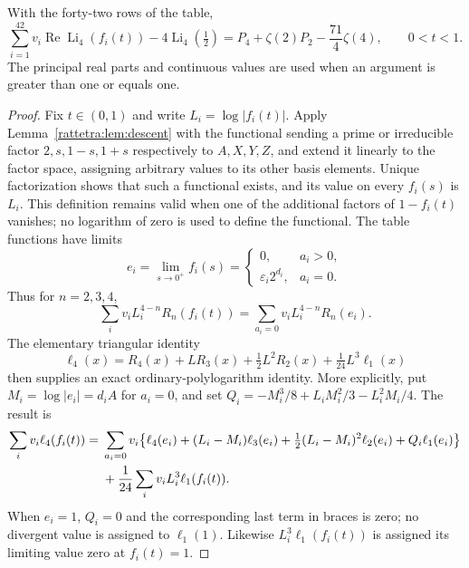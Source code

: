 \begin{theorem}
\label{rattetra:thm:functional}
With the forty-two rows of the table,
\begin{equation}
 \sum_{i=1}^{42}v_i\operatorname{Re}\operatorname{Li}_4(f_i(t))
 -4\operatorname{Li}_4(\tfrac12)
 =P_4+\zeta(2)P_2-\frac{71}{4}\zeta(4),
 \qquad 0<t<1.
\label{rattetra:eq:functional}
\end{equation}
The principal real parts and continuous values are used when an
argument is greater than one or equals one.
\end{theorem}

\begin{proof}
Fix $t\in(0,1)$ and write $L_i=\log|f_i(t)|$.
Apply Lemma~\ref{rattetra:lem:descent} with the functional sending a
prime or irreducible factor $2,s,1-s,1+s$ respectively to
$A,X,Y,Z$, and extend it linearly to the factor space, assigning
arbitrary values to its other basis elements. Unique factorization
shows that such a functional exists, and its value on every
$f_i(s)$ is $L_i$. This definition remains valid when one of the
additional factors of $1-f_i(t)$ vanishes; no logarithm of zero
is used to define the functional. The table functions have limits
\[
 e_i=\lim_{s\to0^+}f_i(s)=
 \begin{cases}0,&a_i>0,\\ \varepsilon_i2^{d_i},&a_i=0.
 \end{cases}
\]
Thus for $n=2,3,4$,
\[
 \sum_i v_iL_i^{4-n}R_n(f_i(t))
  =\sum_{a_i=0}v_iL_i^{4-n}R_n(e_i).
\]
The elementary triangular identity
\[
 \ell_4(x)=R_4(x)+L R_3(x)+\tfrac12L^2R_2(x)
                         +\tfrac1{24}L^3\ell_1(x)
\]
then supplies an exact ordinary-polylogarithm identity. More explicitly,
put $M_i=\log|e_i|=d_iA$ for $a_i=0$, and set
$Q_i=-M_i^3/8+L_iM_i^2/3-L_i^2M_i/4$. The result is
\begin{align}
\sum_i v_i\ell_4(f_i(t))={}&\sum_{a_i=0}v_i\bigl\{
 \ell_4(e_i)+(L_i-M_i)\ell_3(e_i)
 +\tfrac12(L_i-M_i)^2\ell_2(e_i)+Q_i\ell_1(e_i)\bigr\}\notag\\
 &+\frac1{24}\sum_i v_iL_i^3\ell_1(f_i(t)).
\label{rattetra:eq:descent-master}
\end{align}
When $e_i=1$, $Q_i=0$ and the corresponding last term in braces
is zero; no divergent value is assigned to $\ell_1(1)$.
Likewise $L_i^3\ell_1(f_i(t))$ is assigned its limiting value zero
at $f_i(t)=1$.


\end{proof}
